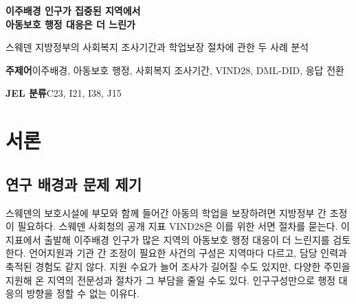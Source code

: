\documentclass[11pt,a4paper]{article}
\begin{document}
\begin{center}
{\LARGE\bfseries 이주배경 인구가 집중된 지역에서\\[5pt] 아동보호 행정 대응은 더 느린가}\par\vspace{10pt}
{\large 스웨덴 지방정부의 사회복지 조사기간과 학업보장 절차에 관한 두 사례 분석}\par\vspace{8pt}
\end{center}
\begin{abstract}
보호시설에 동반 입소한 아동의 학업보장 서면 절차에 관한 스웨덴의 공개 지표 VIND28에서 출발해, 이주배경 인구가 많은 지방정부에서 아동보호 행정 대응이 더 느린지를 검토한다. 세 대도시권 51개 시군 중 2024년 조사기간을 보고한 44개에서 인구구성과 조사기간의 횡단면 연관성은 작았다. 2022--2024년 시군·연도 고정효과 모형에서 스웨덴 출생 아동 중 양부모가 해외 출생인 비중이 같은 시군에서 1\%포인트 높아질 때 조사기간은 평균 6.70일 긴 것으로 추정됐다. 그러나, 영향력이 큰 시군을 함께 제외하거나 연간 변화량을 비교하면 신뢰구간이 0을 포함했다. VIND28의 191개 장기패널에서 2015년 해외 출생 주민 비중이 높은 집단의 충족률은 세 관측 시점인 2023·2025·2026년에 비교집단보다 높았다. 집단 간 격차는 각각 5.48, 20.78, 3.66\%포인트였다. 263개 연결표본에서도 2025년에서 2026년 사이 격차가 줄었으며, 고비중 집단의 충족 건수는 두 해 모두 35개였다. 이 기간의 독립 DML-DID 추정치는 $-18.43$\%포인트(95\% 신뢰구간 $[-40.09,\,3.22]$)였으며, 주별 학습 분할에 따라 추론이 달라졌다.

두 집단에 전국 개편이 동시에 적용돼 정책 효과를 분리할 미적용 비교집단이 없다. 조사기간 보고 시군과 미보고 시군의 인구구성이 달랐으며, 두 지표 모두 개별 아동의 보호·등교 시점을 기록하지 않는다. 따라서 결과는 시군 수준의 조사기간 연관성과 서면 절차 응답 격차의 변화를 보여 주는 데 한정된다.
\end{abstract}
\noindent\textbf{주제어}\enspace 이주배경, 아동보호 행정, 사회복지 조사기간, VIND28, DML-DID, 응답 전환\par
\noindent\textbf{JEL 분류}\enspace C23, I21, I38, J15

\section{서론}
\subsection{연구 배경과 문제 제기}
스웨덴의 보호시설에 부모와 함께 들어간 아동의 학업을 보장하려면 지방정부 간 조정이 필요하다. 스웨덴 사회청의 공개 지표 VIND28은 이를 위한 서면 절차를 묻는다\cite{vind}. 이 지표에서 출발해 이주배경 인구가 많은 지역의 아동보호 행정 대응이 더 느린지를 검토한다. 언어지원과 기관 간 조정이 필요한 사건의 구성은 지역마다 다르고, 담당 인력과 축적된 경험도 같지 않다. 지원 수요가 늘어 조사가 길어질 수도 있지만, 다양한 주민을 지원해 온 지역의 전문성과 절차가 그 부담을 줄일 수도 있다. 인구구성만으로 행정 대응의 방향을 정할 수 없는 이유다.
\end{document}
